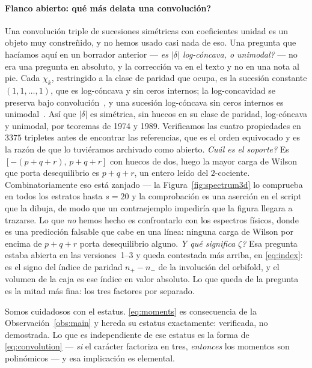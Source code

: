 \documentclass[11pt,a4paper]{article}
\begin{document}
\paragraph{Flanco abierto: \textquestiondown qu\'e m\'as delata una convoluci\'on?} Una
convoluci\'on triple de sucesiones sim\'etricas con coeficientes unidad es un objeto muy
constre\~nido, y no hemos usado casi nada de eso. Una pregunta que hac\'iamos aqu\'i en un
borrador anterior --- \emph{\textquestiondown es $|\delta|$ log-c\'oncava, o unimodal?} --- no
era una pregunta en absoluto, y la correcci\'on va en el texto y no en una nota al pie. Cada
$\chi_k$, restringido a la clase de paridad que ocupa, es la sucesi\'on constante
$(1,1,\dots,1)$, que es log-c\'oncava y sin ceros internos; la log-concavidad se preserva bajo
convoluci\'on~\cite{Hoggar}, y una sucesi\'on log-c\'oncava sin ceros internos es
unimodal~\cite{Stanley}. As\'i que $|\delta|$ es sim\'etrica, sin huecos en su clase de
paridad, log-c\'oncava y unimodal, por teoremas de 1974 y 1989. Verificamos las cuatro
propiedades en $3375$ tripletes antes de encontrar las referencias, que es el orden equivocado
y es la raz\'on de que lo tuvi\'eramos archivado como abierto.
\emph{\textquestiondown Cu\'al es el soporte?} Es
$[-(p{+}q{+}r),\,p{+}q{+}r]$ con huecos de dos, luego la mayor carga de Wilson que porta
desequilibrio es $p+q+r$, un entero le\'ido del $2$-cociente. Combinatoriamente eso est\'a
zanjado --- la Figura~\ref{fig:spectrum3d} lo comprueba en todos los estratos hasta $s=20$ y la
comprobaci\'on es una aserci\'on en el script que la dibuja, de modo que un contraejemplo
impedir\'ia que la figura llegara a trazarse. Lo que \emph{no} hemos hecho es confrontarlo con
los espectros f\'isicos, donde es una predicci\'on falsable que cabe en una l\'inea: ninguna carga de
Wilson por encima de $p+q+r$ porta desequilibrio alguno. \emph{\textquestiondown Y qu\'e
significa $\zeta$?} Esa pregunta estaba abierta en las versiones~1--3 y queda contestada m\'as
arriba, en \eqref{eq:index}: es el signo del \'indice de paridad $n_+-n_-$ de la involuci\'on del
orbifold, y el volumen de la caja es ese \'indice en valor absoluto. Lo que queda de la pregunta
es la mitad m\'as fina: los tres factores por separado.

Somos cuidadosos con el estatus. \eqref{eq:moments} es consecuencia de la
Observaci\'on~\ref{obs:main} y hereda su estatus exactamente: verificada, no demostrada. Lo que
es independiente de ese estatus es la forma de \eqref{eq:convolution} --- \emph{si} el car\'acter
factoriza en tres, \emph{entonces} los momentos son polin\'omicos --- y esa implicaci\'on es
elemental.
\end{document}
